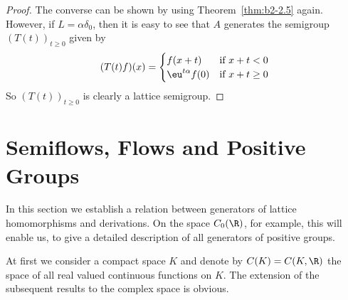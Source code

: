 \begin{proof}
The converse can be shown by using Theorem~\ref{thm:b2-2.5} again.
However, if\/ $L = \alpha\delta_{0}$, then it is easy to see that $A$ generates the semigroup $(T(t))_{t \geq 0}$ given by
\begin{equation*}
(T(t)f)(x) = \begin{cases}
    f(x+t) & \text{if } x+t < 0 \\
    \eu^{t\alpha}f(0) & \text{if } x+t \geq 0
\end{cases}
\end{equation*}
So $(T(t))_{t \geq 0}$ is clearly a lattice semigroup.
\end{proof}
\section{Semiflows, Flows and Positive Groups}\label{sec:b2-3}
In this section we establish a relation between generators of lattice homomorphisms and derivations.
On the space $C_{0}(\R)$, for example, this will enable us, to give a detailed description of all generators of positive groups.

At first we consider a compact space $K$ and denote by $C(K) = C(K,\R)$ the space of all real valued continuous functions on $K$.
The extension of the subsequent results to the complex space is obvious.

